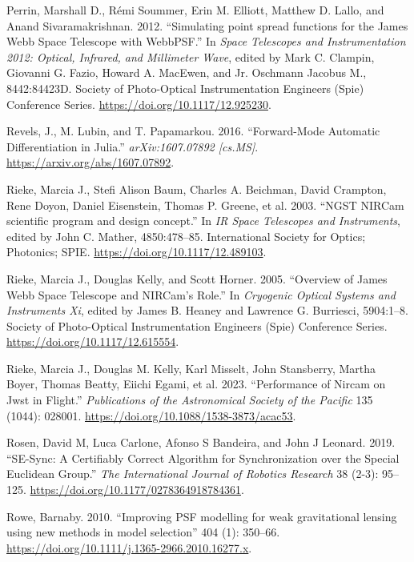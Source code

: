 \documentclass[10pt,a4paper,onecolumn]{article}
\begin{document}
\begin{cslreferences}
\leavevmode\hypertarget{ref-2012SPIE}{}%
Perrin, Marshall D., Rémi Soummer, Erin M. Elliott, Matthew D. Lallo,
and Anand Sivaramakrishnan. 2012. ``Simulating point spread functions
for the James Webb Space Telescope with WebbPSF.'' In \emph{Space
Telescopes and Instrumentation 2012: Optical, Infrared, and Millimeter
Wave}, edited by Mark C. Clampin, Giovanni G. Fazio, Howard A. MacEwen,
and Jr. Oschmann Jacobus M., 8442:84423D. Society of Photo-Optical
Instrumentation Engineers (Spie) Conference Series.
\url{https://doi.org/10.1117/12.925230}.

\leavevmode\hypertarget{ref-RevelsLubinPapamarkou2016}{}%
Revels, J., M. Lubin, and T. Papamarkou. 2016. ``Forward-Mode Automatic
Differentiation in Julia.'' \emph{arXiv:1607.07892 {[}cs.MS{]}}.
\url{https://arxiv.org/abs/1607.07892}.

\leavevmode\hypertarget{ref-10.1117ux2f12.489103}{}%
Rieke, Marcia J., Stefi Alison Baum, Charles A. Beichman, David
Crampton, Rene Doyon, Daniel Eisenstein, Thomas P. Greene, et al. 2003.
``NGST NIRCam scientific program and design concept.'' In \emph{IR Space
Telescopes and Instruments}, edited by John C. Mather, 4850:478--85.
International Society for Optics; Photonics; SPIE.
\url{https://doi.org/10.1117/12.489103}.

\leavevmode\hypertarget{ref-20052005SPIE}{}%
Rieke, Marcia J., Douglas Kelly, and Scott Horner. 2005. ``Overview of
James Webb Space Telescope and NIRCam's Role.'' In \emph{Cryogenic
Optical Systems and Instruments Xi}, edited by James B. Heaney and
Lawrence G. Burriesci, 5904:1--8. Society of Photo-Optical
Instrumentation Engineers (Spie) Conference Series.
\url{https://doi.org/10.1117/12.615554}.

\leavevmode\hypertarget{ref-Rieke_2023}{}%
Rieke, Marcia J., Douglas M. Kelly, Karl Misselt, John Stansberry,
Martha Boyer, Thomas Beatty, Eiichi Egami, et al. 2023. ``Performance of
Nircam on Jwst in Flight.'' \emph{Publications of the Astronomical
Society of the Pacific} 135 (1044): 028001.
\url{https://doi.org/10.1088/1538-3873/acac53}.

\leavevmode\hypertarget{ref-doi:10.1177ux2f0278364918784361}{}%
Rosen, David M, Luca Carlone, Afonso S Bandeira, and John J Leonard.
2019. ``SE-Sync: A Certifiably Correct Algorithm for Synchronization
over the Special Euclidean Group.'' \emph{The International Journal of
Robotics Research} 38 (2-3): 95--125.
\url{https://doi.org/10.1177/0278364918784361}.

\leavevmode\hypertarget{ref-Barnaby2010MNRAS}{}%
Rowe, Barnaby. 2010. ``Improving PSF modelling for weak gravitational
lensing using new methods in model selection'' 404 (1): 350--66.
\url{https://doi.org/10.1111/j.1365-2966.2010.16277.x}.


\end{cslreferences}
\end{document}

